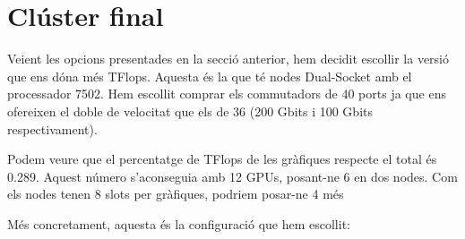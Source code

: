 \section{Clúster final}
Veient les opcions presentades en la secció anterior,  hem decidit escollir la versió que ens dóna més TFlops. Aquesta és la que té nodes Dual-Socket amb el processador 7502. Hem escollit comprar els commutadors de 40 ports ja que ens ofereixen el doble de velocitat que els de 36 (200 Gbits i 100 Gbits respectivament).

Podem veure que el percentatge de TFlops de les gràfiques respecte el total és 0.289. Aquest número s'aconseguia amb 12 GPUs, posant-ne 6 en dos nodes. Com els nodes tenen 8 slots per gràfiques, podriem posar-ne 4 més

Més concretament, aquesta és la configuració que hem escollit:
